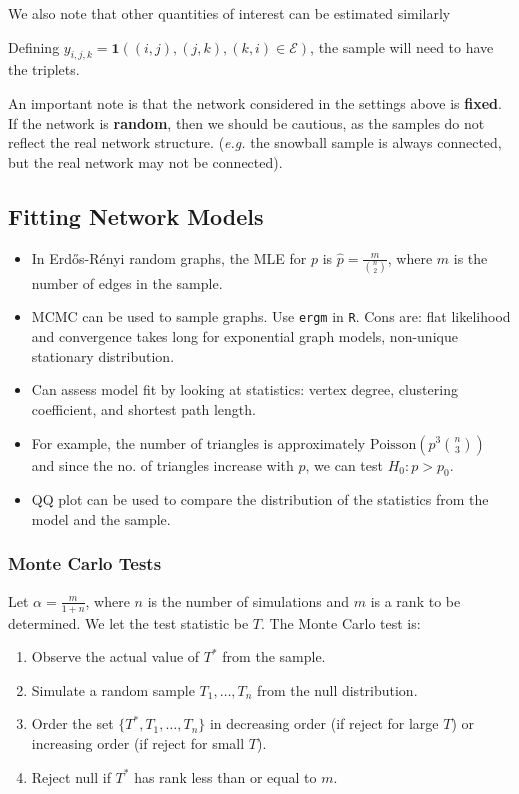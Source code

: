 \documentclass{article}
\begin{document}
We also note that other quantities of interest can be estimated similarly \begin{example}[Triangles]
    Defining $y_{i,j,k}=\mathbf{1}((i,j),(j,k),(k,i)\in \mathcal{E})$, the sample will need to have the triplets.
\end{example}

An important note is that the network considered in the settings above is \textbf{fixed}. If the network is \textbf{random}, then we should be cautious, as the samples do not reflect the real network structure. (\textit{e.g.} the snowball sample is always connected, but the real network may not be connected).  


\subsection{Fitting Network Models}
\begin{itemize}
    \item In Erd\H{o}s-R\'{e}nyi random graphs, the MLE for $p$ is $\hat{p}=\frac{m}{\binom{n}{2}}$, where $m$ is the number of edges in the sample.
    \item MCMC can be used to sample graphs. Use \verb|ergm| in \verb|R|. Cons are: flat likelihood and convergence takes long for exponential graph models, non-unique stationary distribution.
    \item Can assess model fit by looking at statistics: vertex degree, clustering coefficient, and shortest path length.
    \item For example, the number of triangles is approximately $\mathrm{Poisson}(p^3\binom{n}{3})$ and since the no. of triangles increase with $p$, we can test $H_0: p>p_0$. 
    \item QQ plot can be used to compare the distribution of the statistics from the model and the sample.
\end{itemize}

\subsubsection{Monte Carlo Tests} 
Let $\alpha = \frac{m}{1+n}$, where $n$ is the number of simulations and $m$ is a rank to be determined. We let the test statistic be $T$. The Monte Carlo test is:
\begin{enumerate}
    \item Observe the actual value of $T^*$ from the sample.
    \item Simulate a random sample $T_1, \ldots, T_n$ from the null distribution.
    \item Order the set $\{T^*, T_1, \ldots, T_n\}$ in decreasing order (if reject for large $T$) or increasing order (if reject for small $T$).
    \item Reject null if $T^*$ has rank less than or equal to $m$.
\end{enumerate}
\end{document}

